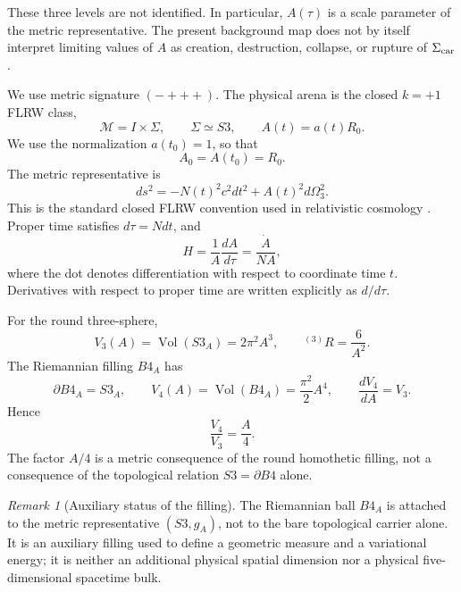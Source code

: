 \documentclass[11pt,a4paper]{article}
\def\Bfour{B4}%
\def\Sthree{S3}%
\def\dd{d}%
\numberwithin{equation}{section}
\theoremstyle{remark}
\newtheorem{remark}[criterion]{Remark}
\newcommand{\Sthree}{S^3}
\newcommand{\Bfour}{B^4}
\newcommand{\M}{\mathcal{M}}
\newcommand{\vol}{\operatorname{Vol}}
\newcommand{\dd}{\mathrm{d}}
\begin{document}
These three levels are not identified. In particular, \(A(\tau)\) is a scale parameter of the metric representative. The present background map does not by itself interpret limiting values of \(A\) as creation, destruction, collapse, or rupture of \(\Sigma_{\rm car}\).

We use metric signature \((-+++)\). The physical arena is the closed \(k=+1\) FLRW class,
\begin{equation}
\M=I\times \Sigma,
\qquad
\Sigma\simeq \Sthree,
\qquad
A(t)=a(t)R_0.
\end{equation}
We use the normalization \(a(t_0)=1\), so that
\begin{equation}
A_0=A(t_0)=R_0.
\end{equation}
The metric representative is
\begin{equation}
\dd s^2=-N(t)^2c^2\dd t^2+A(t)^2\dd\Omega_3^2.
\end{equation}
This is the standard closed FLRW convention used in relativistic cosmology \cite{HawkingEllis1973,MTW1973,Weinberg2008}.
Proper time satisfies \(\dd\tau=N\dd t\), and
\begin{equation}
H=\frac{1}{A}\frac{\dd A}{\dd\tau}=\frac{\dot A}{NA},
\end{equation}
where the dot denotes differentiation with respect to coordinate time \(t\). Derivatives with respect to proper time are written explicitly as \(\dd/\dd\tau\).

For the round three-sphere,
\begin{equation}
V_3(A)=\vol(\Sthree_A)=2\pi^2A^3,
\qquad
{}^{(3)}R=\frac{6}{A^2}.
\end{equation}
The Riemannian filling \(\Bfour_A\) has
\begin{equation}
\partial \Bfour_A=\Sthree_A,
\qquad
V_4(A)=\vol(\Bfour_A)=\frac{\pi^2}{2}A^4,
\qquad
\frac{\dd V_4}{\dd A}=V_3.
\end{equation}
Hence
\begin{equation}
\frac{V_4}{V_3}=\frac{A}{4}.
\end{equation}
The factor \(A/4\) is a metric consequence of the round homothetic filling, not a consequence of the topological relation \(\Sthree=\partial\Bfour\) alone.

\begin{remark}[Auxiliary status of the filling]
The Riemannian ball \(\Bfour_A\) is attached to the metric representative \((\Sthree,g_A)\), not to the bare topological carrier alone. It is an auxiliary filling used to define a geometric measure and a variational energy; it is neither an additional physical spatial dimension nor a physical five-dimensional spacetime bulk.
\end{remark}
\end{document}
